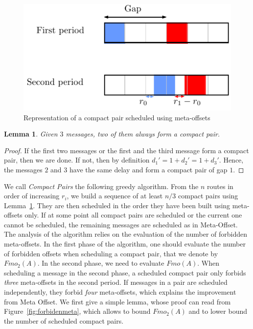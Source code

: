 \documentclass[10pt, conference, letterpaper]{IEEEtran}
\newtheorem{lemma}[theorem]{Lemma}
\begin{document}
\begin{figure}[h]
\begin{center}

\includegraphics[scale=0.7]{compact_pair}
\end{center}
\caption{Representation of a compact pair scheduled using meta-offsets}
\end{figure}

\begin{lemma}\label{lemma:pair_find}
Given $3$ messages, two of them always form a compact pair. 
\end{lemma}
\begin{proof}
If the first two messages or the first and the third message form a compact pair,
then we are done. If not, then by definition $d_{1}' = 1 + d_{2}' = 1 + d_{3}'$. Hence, the messages $2$ and $3$ have the same delay and form a compact pair of gap $1$.
\end{proof}

We call \emph{Compact Pairs} the following greedy algorithm. From the $n$ routes in order
of increasing $r_i$, we build a sequence of at least $n/3$ compact pairs using Lemma~\ref{lemma:pair_find}. They are then scheduled in the order they have been built using meta-offsets only. If at some point all compact pairs are scheduled or the current one cannot be scheduled, the remaining messages are scheduled as in Meta-Offset. The analysis of the algorithm relies on the evaluation of the number of forbidden meta-offsets. In the first phase of the algorithm, one should evaluate the number of forbidden offsets when scheduling a compact pair, that we denote by $Fmo_2(A)$. In the second phase, we need to evaluate $Fmo(A)$. When scheduling a message in the second phase, a scheduled compact pair only forbids \emph{three} meta-offsets in the second period. If messages in a pair are scheduled independently, they forbid \emph{four} meta-offsets, which explains the improvement from Meta Offset. We first give a simple lemma, whose proof can read from Figure~\ref{fig:forbidenmeta}, which allows to bound $Fmo_2(A)$ and to lower bound the number of scheduled compact pairs.
\end{document}
